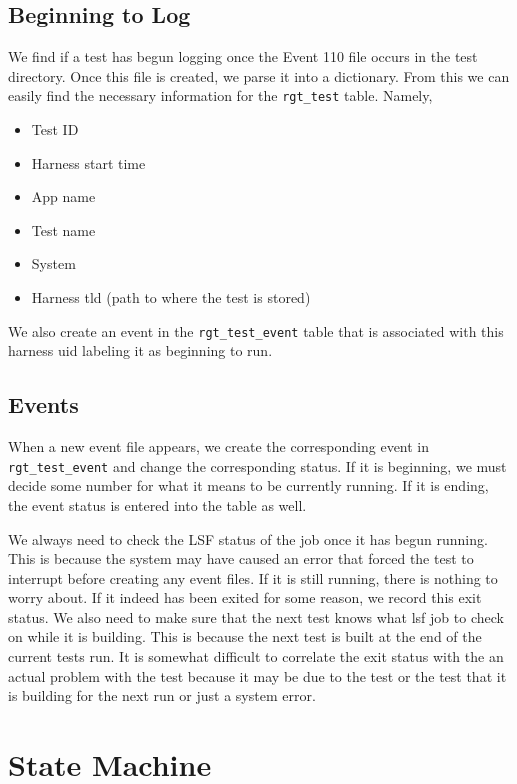 \documentclass{article}
\begin{document}
\subsection{Beginning to Log}

We find if a test has begun logging once the Event 110 file occurs in the test directory. Once this file is created, we parse it into a dictionary. From this we can easily find the necessary information for the \texttt{rgt\_test} table. 
Namely,
\begin{itemize}
	\item Test ID
	\item Harness start time
	\item App name
	\item Test name
	\item System
	\item Harness tld (path to where the test is stored)
\end{itemize}

We also create an event in the \texttt{rgt\_test\_event} table that is associated with this harness uid labeling it as beginning to run.

\subsection{Events}

When a new event file appears, we create the corresponding event in \texttt{rgt\_test\_event} and change the corresponding status. If it is beginning, we must decide some number for what it means to be currently running. If it is ending, the event status is entered into the table as well.

We always need to check the LSF status of the job once it has begun running. This is because the system may have caused an error that forced the test to interrupt before creating any event files. If it is still running, there is nothing to worry about. If it indeed has been exited for some reason, we record this exit status. We also need to make sure that the next test knows what lsf job to check on while it is building. This is because the next test is built at the end of the current tests run. It is somewhat difficult to correlate the exit status with the an actual problem with the test because it may be due to the test or the test that it is building for the next run or just a system error.

\newpage

\section{State Machine}
\end{document}
